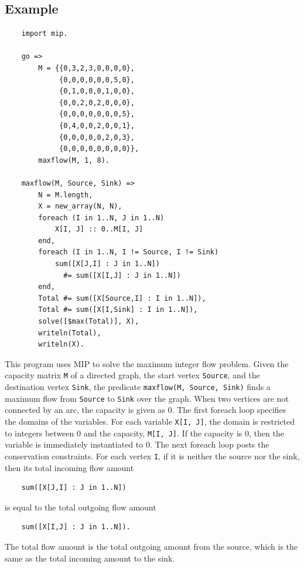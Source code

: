 \subsection*{Example}
\begin{verbatim}
    import mip.

    go =>
        M = {{0,3,2,3,0,0,0,0},
             {0,0,0,0,0,0,5,0},
             {0,1,0,0,0,1,0,0},
             {0,0,2,0,2,0,0,0},
             {0,0,0,0,0,0,0,5},
             {0,4,0,0,2,0,0,1},
             {0,0,0,0,0,2,0,3},
             {0,0,0,0,0,0,0,0}},
        maxflow(M, 1, 8).

    maxflow(M, Source, Sink) =>
        N = M.length,
        X = new_array(N, N),
        foreach (I in 1..N, J in 1..N)
            X[I, J] :: 0..M[I, J]
        end,
        foreach (I in 1..N, I != Source, I != Sink)
            sum([X[J,I] : J in 1..N]) 
              #= sum([X[I,J] : J in 1..N]) 
        end,
        Total #= sum([X[Source,I] : I in 1..N]),
        Total #= sum([X[I,Sink] : I in 1..N]),
        solve([$max(Total)], X),
        writeln(Total),
        writeln(X).
\end{verbatim}
This program uses MIP to solve the maximum integer flow problem. Given the capacity matrix \texttt{M} of a directed graph, the start vertex \texttt{Source}, and the destination vertex \texttt{Sink}, the predicate \texttt{maxflow(M, Source, Sink)} finds a maximum flow from \texttt{Source} to \texttt{Sink} over the graph. When two vertices are not connected by an arc, the capacity is given as 0. The first foreach loop specifies the domains of the variables. For each variable \texttt{X[I, J]}, the domain is restricted to integers between 0 and the capacity, \texttt{M[I, J]}. If the capacity is 0, then the variable is immediately instantiated to 0. The next foreach loop posts the conservation constraints. For each vertex \texttt{I}, if it is neither the source nor the sink, then its total incoming flow amount 
\begin{verbatim}
    sum([X[J,I] : J in 1..N])
\end{verbatim}
is equal to the total outgoing flow amount 
\begin{verbatim}
    sum([X[I,J] : J in 1..N]).
\end{verbatim}
The total flow amount is the total outgoing amount from the source, which is the same as the total incoming amount to the sink.

